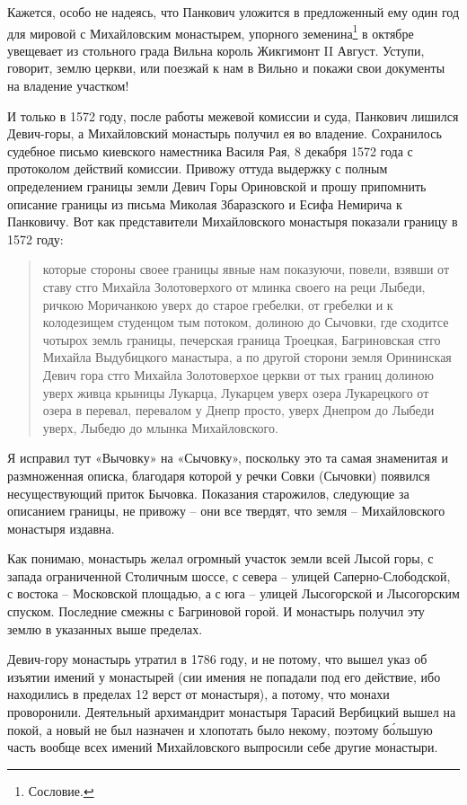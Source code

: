 Кажется, особо не надеясь, что Панкович уложится в предложенный ему один год для мировой с Михайловским монастырем, упорного земенина\footnote{Сословие.} в октябре увещевает из стольного града Вильна король Жикгимонт II Август. Уступи, говорит, землю церкви, или поезжай к нам в Вильно и покажи свои документы на владение участком!

И только в 1572 году, после работы межевой комиссии и суда, Панкович лишился Девич-горы, а Михайловский монастырь получил ея во владение. Сохранилось судебное письмо киевского наместника Василя Рая, 8 декабря 1572 года с протоколом действий комиссии. Привожу оттуда выдержку с полным определением границы земли Девич Горы Ориновской и прошу припомнить описание границы из письма Миколая Збаразского и Есифа Немирича к Панковичу. Вот как представители Михайловского монастыря показали границу в 1572 году\cite{mihdocs}:

\begin{quotation}
которые стороны своее границы явные нам показуючи, повели, взявши от ставу стго Михайла
Золотоверхого от млинка своего на реци Лыбеди, ричкою Моричанкою уверх до старое гребелки, от гребелки и к колодезищем студенцом тым потоком, долиною до Сычовки, где сходитсе чотырох земль границы, печерская граница Троецкая, Багриновская стго Михайла Выдубицкого манастыра, а по другой сторони земля Орининская Девич гора стго Михайла Золотоверхое церкви от тых границ долиною уверх живца крыницы Лукарца, Лукарцем уверх озера Лукарецкого от озера в перевал, перевалом у Днепр просто, уверх Днепром до Лыбеди уверх, Лыбедю до млынка Михайловского.
\end{quotation}

Я исправил тут «Вычовку» на «Сычовку», поскольку это та самая знаменитая и размноженная описка, благодаря которой у речки Совки (Сычовки) появился несуществующий приток Бычовка. Показания старожилов, следующие за описанием границы, не привожу – они все твердят, что земля – Михайловского монастыря издавна. 

Как понимаю, монастырь желал огромный участок земли всей Лысой горы, с запада ограниченной Столичным шоссе, с севера – улицей Саперно-Слободской, с востока – Московской площадью, а с юга – улицей Лысогорской и Лысогорским спуском. Последние смежны с Багриновой горой. И монастырь получил эту землю в указанных выше пределах.

Девич-гору монастырь утратил в 1786 году, и не потому, что вышел указ об изъятии имений у монастырей (сии имения не попадали под его действие, ибо находились в пределах 12 верст от монастыря), а потому, что монахи проворонили. Деятельный архимандрит монастыря Тарасий Вербицкий вышел на покой, а новый не был назначен и хлопотать было некому, поэтому б\'ольшую часть вообще всех имений Михайловского выпросили себе другие монастыри.


